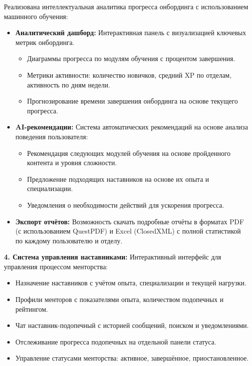 Реализована интеллектуальная аналитика прогресса онбординга с использованием машинного обучения:
\begin{itemize}
	\item \textbf{Аналитический дашборд:} Интерактивная панель с визуализацией ключевых метрик онбординга.
	\begin{itemize}
		\item Диаграммы прогресса по модулям обучения с процентом завершения.
		\item Метрики активности: количество новичков, средний XP по отделам, активность по дням недели.
		\item Прогнозирование времени завершения онбординга на основе текущего прогресса.
	\end{itemize}
	
	\item \textbf{AI-рекомендации:} Система автоматических рекомендаций на основе анализа поведения пользователя:
	\begin{itemize}
		\item Рекомендация следующих модулей обучения на основе пройденного контента и уровня сложности.
		\item Предложение подходящих наставников на основе их опыта и специализации.
		\item Уведомления о необходимости действий для ускорения прогресса.
	\end{itemize}
	
	\item \textbf{Экспорт отчётов:} Возможность скачать подробные отчёты в форматах PDF (с использованием QuestPDF) и Excel (ClosedXML) с полной статистикой по каждому пользователю и отделу.
\end{itemize}

\textbf{4. Система управления наставниками:}
Интерактивный интерфейс для управления процессом менторства:
\begin{itemize}
	\item Назначение наставников с учётом опыта, специализации и текущей нагрузки.
	\item Профили менторов с показателями опыта, количеством подопечных и рейтингом.
	\item Чат наставник-подопечный с историей сообщений, поиском и уведомлениями.
	\item Отслеживание прогресса подопечных на отдельной панели статуса.
	\item Управление статусами менторства: активное, завершённое, приостановленное.
\end{itemize}

